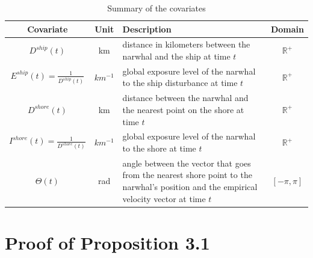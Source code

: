 \documentclass[aoas]{imsart}
\theoremstyle{definition}
\theoremstyle{remark}
\theoremstyle{remark}
\newcommand {\R}{\mathbb{R}}
\newcommand {\1}{\mathbb{1}}
\begin{document}
\begin{table}[ht!]
	\centering
	\begin{tabular}{|c|c|p{8cm}|c|}
		\hline
		Covariate & Unit & Description & Domain \\
		\hline
		$D^{ship}(t)$ & km & distance in kilometers between the narwhal and the ship at time $t$ & $\R^+$ \\
		\hline
		$E^{ship}(t)=\frac{1}{D^{ship}(t)}$ & $km^{-1}$ & global exposure level of the narwhal to the ship disturbance at time $t$ & $\R^+$ \\
		\hline
		$D^{shore}(t)$ & km & distance between the narwhal and the nearest point on the shore at time $t$ & $\R^+$ \\
		\hline
		$I^{shore}(t)=\frac{1}{D^{shore}(t)}$ & $km^{-1}$ & global exposure level of the narwhal to the shore at time $t$ & $\R^+$ \\
		\hline
		$\Theta(t)$ & rad & angle between the vector that goes from the nearest shore point to the narwhal's position and the empirical velocity vector at time $t$  & $[-\pi,\pi]$ \\
		\hline 
	\end{tabular}
	\caption{Summary of the covariates}
	\label{tab: summary covariates}
\end{table}


\section{Proof of Proposition 3.1}
\label{section: transition density proof}
\end{document}
